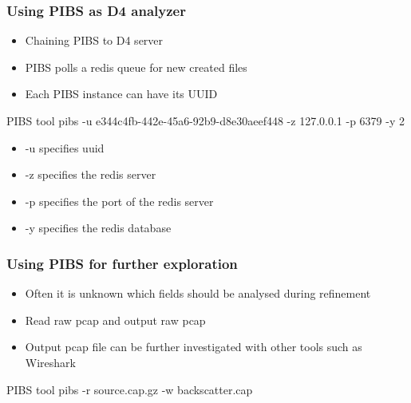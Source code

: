 \documentclass{beamer}
\begin{document}
\begin{frame}
    \frametitle{Using PIBS as D4 analyzer}
    \begin{itemize}
        \item Chaining PIBS to D4 server
        \item PIBS polls a redis queue for new created files
        \item Each PIBS instance can have its UUID
    \end{itemize}
    \begin{block}{PIBS tool}
        pibs -u e344c4fb-442e-45a6-92b9-d8e30aeef448 -z 127.0.0.1 -p 6379 -y 2
    \end{block}
    \begin{itemize}
        \item -u specifies uuid
        \item -z specifies the redis server
        \item -p specifies the port of the redis server
        \item -y specifies the redis database
    \end{itemize}
\end{frame}

\begin{frame}
    \frametitle{Using PIBS for further exploration}
    \begin{itemize}
        \item Often it is unknown which fields should be analysed during refinement
        \item Read raw pcap and output raw pcap
        \item Output pcap file can be further investigated with other tools such as Wireshark
    \end{itemize}
    \begin{block}{PIBS tool}
        pibs -r source.cap.gz -w backscatter.cap
    \end{block}
\end{frame}
\end{document}
